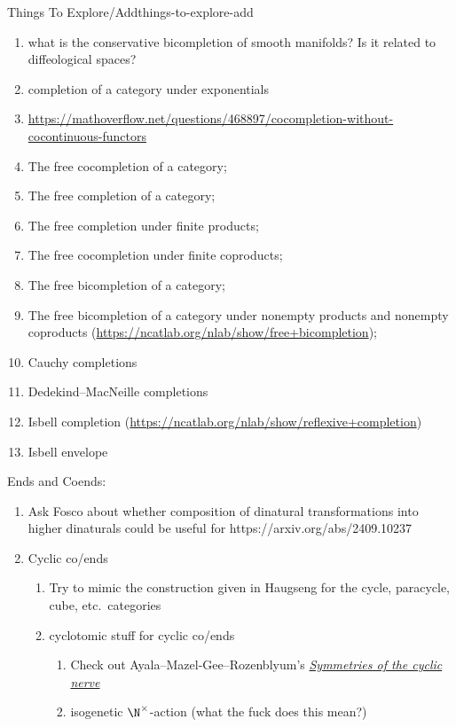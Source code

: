\begin{remark}{Things To Explore/Add}{things-to-explore-add}
\begin{enumerate}
        \item what is the conservative bicompletion of smooth manifolds? Is it related to diffeological spaces?
        \item completion of a category under exponentials
        \item \url{https://mathoverflow.net/questions/468897/cocompletion-without-cocontinuous-functors}
        \item The free cocompletion of a category;
        \item The free completion of a category;
        \item The free completion under finite products;
        \item The free cocompletion under finite coproducts;
        \item The free bicompletion of a category;
        \item The free bicompletion of a category under nonempty products and nonempty coproducts (\url{https://ncatlab.org/nlab/show/free+bicompletion});
        \item Cauchy completions
        \item Dedekind--MacNeille completions
        \item Isbell completion (\url{https://ncatlab.org/nlab/show/reflexive+completion})
        \item Isbell envelope
    \end{enumerate}
    Ends and Coends:
    \begin{enumerate}
        \item Ask Fosco about whether composition of dinatural transformations into higher dinaturals could be useful for https://arxiv.org/abs/2409.10237
        \item Cyclic co/ends
            \begin{enumerate}
                \item Try to mimic the construction given in Haugseng for the cycle, paracycle, cube, etc.\ categories
                \item cyclotomic stuff for cyclic co/ends
                    \begin{enumerate}
                        \item Check out Ayala--Mazel-Gee--Rozenblyum's \textit{\href{https://arxiv.org/abs/2405.03897}{Symmetries of the cyclic nerve}}
                        \item isogenetic $\N^{\times}$-action (what the fuck does this mean?)
                    \end{enumerate}

\end{enumerate}
\end{enumerate}
\end{remark}
